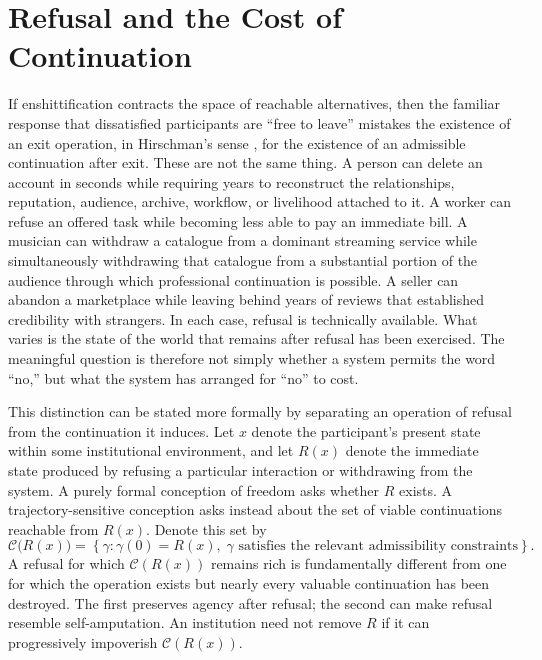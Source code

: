 \documentclass[11pt]{article}
\begin{document}
\section{Refusal and the Cost of Continuation}

If enshittification contracts the space of reachable alternatives, then the familiar response that dissatisfied participants are ``free to leave'' mistakes the existence of an exit operation, in Hirschman's sense \citep{hirschman1970exit}, for the existence of an admissible continuation after exit. These are not the same thing. A person can delete an account in seconds while requiring years to reconstruct the relationships, reputation, audience, archive, workflow, or livelihood attached to it. A worker can refuse an offered task while becoming less able to pay an immediate bill. A musician can withdraw a catalogue from a dominant streaming service while simultaneously withdrawing that catalogue from a substantial portion of the audience through which professional continuation is possible. A seller can abandon a marketplace while leaving behind years of reviews that established credibility with strangers. In each case, refusal is technically available. What varies is the state of the world that remains after refusal has been exercised. The meaningful question is therefore not simply whether a system permits the word ``no,'' but what the system has arranged for ``no'' to cost.

This distinction can be stated more formally by separating an operation of refusal from the continuation it induces. Let \(x\) denote the participant's present state within some institutional environment, and let \(R(x)\) denote the immediate state produced by refusing a particular interaction or withdrawing from the system. A purely formal conception of freedom asks whether \(R\) exists. A trajectory-sensitive conception asks instead about the set of viable continuations reachable from \(R(x)\). Denote this set by
\[
\mathcal{C}\bigl(R(x)\bigr)
=
\left\{
\gamma :
\gamma(0)=R(x),\;
\gamma \text{ satisfies the relevant admissibility constraints}
\right\}.
\]
A refusal for which \(\mathcal{C}(R(x))\) remains rich is fundamentally different from one for which the operation exists but nearly every valuable continuation has been destroyed. The first preserves agency after refusal; the second can make refusal resemble self-amputation. An institution need not remove \(R\) if it can progressively impoverish \(\mathcal{C}(R(x))\).
\end{document}
